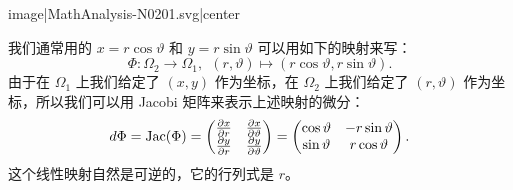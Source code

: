 {{image|MathAnalysis-N0201.svg|center}}

我们通常用的 $x=r\cos\vartheta$ 和 $y=r\sin \vartheta$ 可以用如下的映射来写：
\[\Phi\colon \Omega_2\rightarrow \Omega_1, \ \ (r,\vartheta)\mapsto (r\cos\vartheta, r\sin \vartheta). \]
由于在 $\Omega_1$ 上我们给定了 $(x,y)$ 作为坐标，在 $\Omega_2$ 上我们给定了 $(r,\vartheta)$ 作为坐标，所以我们可以用 Jacobi 矩阵来表示上述映射的微分：
\[d\Phi = {\rm Jac}(\Phi) = \begin{pmatrix}
   \frac{\partial x}{\partial r}&  \frac{\partial x}{\partial \vartheta} \\
    \frac{\partial y}{\partial r} &  \frac{\partial y}{\partial \vartheta} \\
  \end{pmatrix} = \begin{pmatrix}
  \cos\vartheta&    -r\sin\vartheta \\
     \sin\vartheta &    r\cos\vartheta\\
  \end{pmatrix}.\]
这个线性映射自然是可逆的，它的行列式是 $r$。
